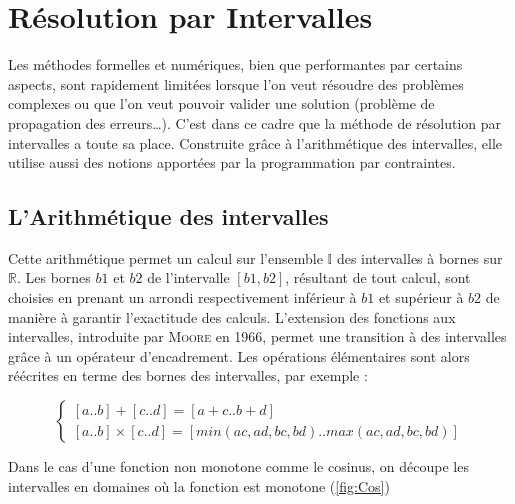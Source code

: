 \section{Résolution par Intervalles}
Les méthodes formelles et numériques, bien que performantes par certains aspects, sont rapidement limitées lorsque l'on veut résoudre des problèmes complexes ou que l'on veut pouvoir valider une solution (problème de propagation des erreurs\dots{}). C'est dans ce cadre que la méthode de résolution par intervalles a toute sa place. Construite grâce à l'arithmétique des intervalles, elle utilise aussi des notions apportées par la programmation par contraintes.
 
\subsection{L'Arithmétique des intervalles}
Cette arithmétique permet un calcul sur l'ensemble $\mathbb{I}$ des intervalles à bornes sur $\mathbb{R}$. Les bornes $b1$ et $b2$ de l'intervalle $[b1,b2]$, résultant de tout calcul, sont choisies en prenant un arrondi respectivement inférieur à $b1$ et supérieur à $b2$ de manière à garantir l'exactitude des calculs. L'extension des fonctions aux intervalles, introduite par \textsc{Moore} en 1966, permet une transition à des intervalles grâce à un opérateur d'encadrement. Les opérations élémentaires sont alors réécrites en terme des bornes des intervalles, par exemple : 

\begin{equation}\label{eq2}
\begin{cases}
[a .. b] + [c .. d] = [a + c .. b + d] \\
[a .. b] × [c .. d] = [min(ac, ad, bc, bd) .. max(ac, ad, bc, bd)]
\end{cases}
\end{equation}

Dans le cas d’une fonction non monotone comme le cosinus, on découpe les intervalles en domaines où la fonction est monotone  (\ref{fig:Cos})

